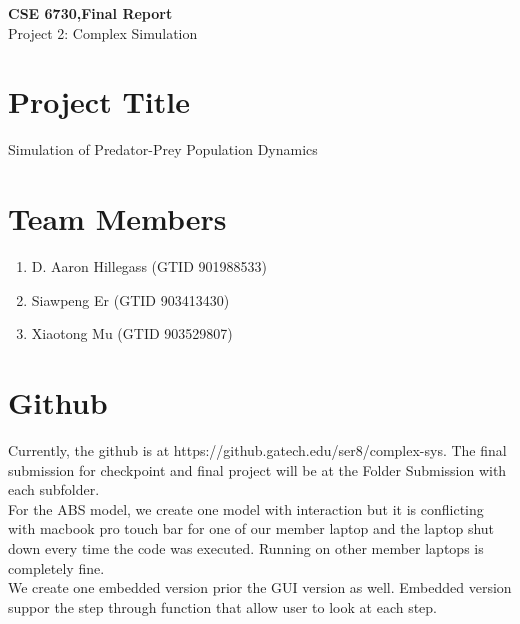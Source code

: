 \documentclass{article}
\begin{document}
	\begin{center}
		
		\LARGE{\textbf{CSE 6730,Final Report}} \\
		\vspace{1em}
		\Large{Project 2: Complex Simulation} \\
		
	\end{center}
	\begin{normalsize}
		
		\section{Project Title}
		
		Simulation of Predator-Prey Population Dynamics 
		
		\section{Team Members}
		
		\begin{enumerate}
			\item D. Aaron Hillegass (GTID 901988533)
			\item Siawpeng Er (GTID 903413430)
			\item Xiaotong Mu (GTID 903529807)
		\end{enumerate}
	
		\section{Github}
		Currently, the github is at https://github.gatech.edu/ser8/complex-sys.
		The final submission for checkpoint and final project will be at the Folder Submission with each subfolder.\\

		For the ABS model, we create one model with interaction but it is conflicting with macbook pro touch bar for one of our member laptop and the laptop shut down every time the code was executed. Running on other member laptops is completely fine. \\
		We create one embedded version prior the GUI version as well. Embedded version suppor the step through function that allow user to look at each step.

		

\end{normalsize}
\end{document}
